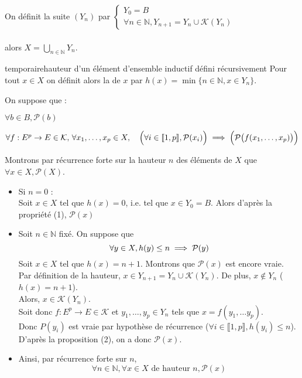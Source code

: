 \begin{demonstration}
    On définit la suite $(Y_n)$ par $\begin{cases}
        Y_0 =  B \\
        \forall n \in \mathbb{N}, Y_{n+1} = Y_n \cup \mathcal{K}(Y_n)
    \end{cases}$ \\ \\
    alors $X = \bigcup_{n \in \mathbb{N}}Y_n$. 
    \begin{definition}{temporaire}{hauteur d'un élément d'ensemble inductif défini récursivement}
        Pour tout $x \in X$ on définit alors la  de $x$ par $h(x) = \min \{n \in \mathbb{N}, x \in Y_n\}$.
    \end{definition}
    On suppose que : 
    \begin{enumeratebf}
        \item $\forall b \in B, \mathcal{P}(b)$
        \item $\forall f : E^p \rightarrow E \in \mathcal{K}, \, \forall x_1,\ldots, x_p \in X, \quad \Bigl(\forall i \in \llbracket 1,p \rrbracket, \mathcal{P}(x_i)\Bigr) \implies \Bigl(\mathcal{P}\bigl(f(x_1,\ldots,x_p)\bigr)\Bigr)$
    \end{enumeratebf}
    Montrons par récurrence forte sur la hauteur $n$ des éléments de $X$ que $\forall x \in X, \mathcal{P}(X)$.
    \begin{itemize}
        \item Si $n = 0$ : \\Soit $x \in X$ tel que $h(x) = 0$, i.e. tel que $x \in Y_0 = B$. Alors d'après la propriété (1), $\mathcal{P}(x)$
        \item Soit $n \in \mathbb{N}$ fixé. On suppose que $$\forall y \in X, h(y) \leq n \implies \mathcal{P}(y)$$ Soit $x \in X$ tel que $h(x) = n+1$. Montrons que $\mathcal{P}(x)$ est encore vraie.\\Par définition de la hauteur, $x \in Y_{n+1} = Y_{n} \cup \mathcal{K}(Y_n)$. De plus, $x \notin Y_n$ ($h(x) = n+1$).\\Alors, $x \in \mathcal{K}(Y_n)$.\\Soit donc $f : E^p \rightarrow E \in \mathcal{K}$ et $y_1, \ldots, y_p \in Y_n$ tels que $x = f(y_1,\ldots y_p)$.\\Donc $P(y_i)$ est vraie par hypothèse de récurrence ($\forall i \in \llbracket 1,p \rrbracket, h(y_i) \leq n$).\\D'après la proposition (2), on a donc $\mathcal{P}(x)$. 
        \item Ainsi, par récurrence forte sur $n$, $$\forall n \in \mathbb{N}, \forall x \in X \text{ de hauteur } n, \mathcal{P}(x)$$
    \end{itemize}
\end{demonstration}
